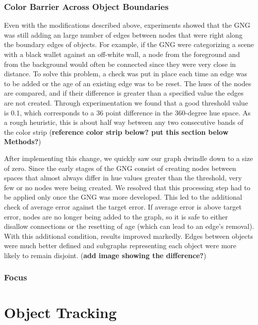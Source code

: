 \documentclass{article}
\renewcommand{\|}{\origbar} %
\begin{document}
\subsubsection{Color Barrier Across Object Boundaries}

Even with the modifications described above, experiments showed that the GNG was still adding an large number of edges between nodes that were right along the boundary edges of objects. For example, if the GNG were categorizing a scene with a black wallet against an off-white wall, a node from the foreground and from the background would often be connected since they were very close in distance. To solve this problem, a check was put in place each time an edge was to be added or the age of an existing edge was to be reset. The hues of the nodes are compared, and if their difference is greater than a specified value the edges are not created. Through experimentation we found that a good threshold value is 0.1, which corresponds to a 36 point difference in the 360-degree hue space. As a rough heuristic, this is about half way between any two consecutive bands of the color strip ({\bf reference color strip below? put this section below Methods?})

After implementing this change, we quickly saw our graph dwindle down to a size of zero. Since the early stages of the GNG consist of creating nodes between spaces that almost always differ in hue values greater than the threshold, very few or no nodes were being created. We resolved that this processing step had to be applied only once the GNG was more developed. This led to the additional check of average error against the target error. If average error is above target error, nodes are no longer being added to the graph, so it is safe to either disallow connections or the resetting of age (which can lead to an edge's removal). With this additional condition, results improved markedly. Edges between objects were much better defined and subgraphs representing each object were more likely to remain disjoint. ({\bf add image showing the difference?})

\subsubsection{Focus}

\section{Object Tracking}
\label{sec:objectTracking}
\end{document}
